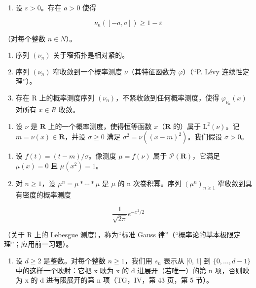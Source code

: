 \begin{enumerate}
\def\labelenumi{\alph{enumi})}
\setcounter{enumi}{5}
\tightlist
\item
  设 \(\varepsilon > 0\)。存在 \(a > 0\) 使得
\end{enumerate}

\[
\nu_ {n} ([ - a, a ]) \geqslant 1 - \varepsilon
\]

（对每个整数 \(n \in N\)）。

\begin{enumerate}
\def\labelenumi{\alph{enumi})}
\setcounter{enumi}{6}
\item
  序列 \((\nu_{n})\) 关于窄拓扑是相对紧的。
\item
  序列 \((\nu_{n})\) 窄收敛到一个概率测度 \(\nu\)（其特征函数为 \(\varphi\)）（“P. Lévy 连续性定理”）。
\item
  存在 R 上的概率测度序列 \((\nu_{n})\)，不紧收敛到任何概率测度，使得 \(\varphi_{\nu_{n}}(x)\) 对所有 \(x \in R\) 收敛。
\end{enumerate}

\begin{enumerate}
\def\labelenumi{\arabic{enumi})}
\setcounter{enumi}{39}
\tightlist
\item
  设 \(\nu\) 是 \(\mathbf{R}\) 上的一个概率测度，使得恒等函数 \(x\)（\(\mathbf{R}\) 的）属于 \(\mathrm{L}^2 (\nu)\)。记 \(m = \nu (x)\in \mathbf{R}\)，并设 \(\sigma \geqslant 0\) 满足 \(\sigma^2 = \nu ((x - m)^2)\)。我们假设 \(\sigma >0\)。
\end{enumerate}

\begin{enumerate}
\def\labelenumi{\alph{enumi})}
\item
  设 \(f(t) = (t - m) / \sigma\)。像测度 \(\mu = f(\nu)\) 属于 \(\mathcal{P}(\mathbf{R})\)，它满足 \(\mu(x) = 0\) 且 \(\mu(x^2) = 1\)。
\item
  对 \(n \geqslant 1\)，设 \(\mu^{n} = \mu * \cdots * \mu\) 是 \(\mu\) 的 n 次卷积幂。序列 \((\mu^{n})_{n \geqslant 1}\) 窄收敛到具有密度的概率测度
\end{enumerate}

\[
\frac {1}{\sqrt {2 \pi}} e ^ {- x ^ {2} / 2}
\]

（关于 R 上的 Lebesgue 测度），称为“标准 Gauss 律”（“概率论的基本极限定理”；应用前一习题）。

\begin{enumerate}
\def\labelenumi{\alph{enumi})}
\setcounter{enumi}{2}
\tightlist
\item
  设 \(d \geqslant 2\) 是整数。对每个整数 \(n \geqslant 1\)，我们用 \(s_{n}\) 表示从 {[}0, 1{]} 到 \(\{0, \ldots, d - 1\}\) 中的这样一个映射：它把 x 映为 x 的 d 进展开（若唯一）的第 n 项，否则映为 x 的 d 进有限展开的第 n 项（TG，IV，第 43 页，第 5 节）。
\end{enumerate}

